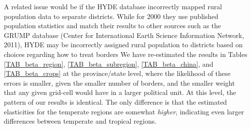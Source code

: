 \documentclass[11pt]{article}
\begin{document}
A related issue would be if the HYDE database incorrectly mapped rural population data to separate districts. While for 2000 they use published population statistics and match their results to other sources such as the GRUMP database \nocite{GRUMP} (Center for International Earth Science Information Network, 2011), HYDE may be incorrectly assigned rural population to districts based on choices regarding how to treat borders We have re-estimated the results in Tables \ref{TAB_beta_region}, \ref{TAB_beta_subregion}, \ref{TAB_beta_china}, and \ref{TAB_beta_crops} at the province/state level, where the likelihood of these errors is smaller, given the smaller number of borders, and the smaller weight that any given grid-cell would have in a larger political unit. At this level, the pattern of our results is identical. The only difference is that the estimated elasticities for the temperate regions are somewhat \textit{higher}, indicating even larger differences between temperate and tropical regions.
\end{document}
